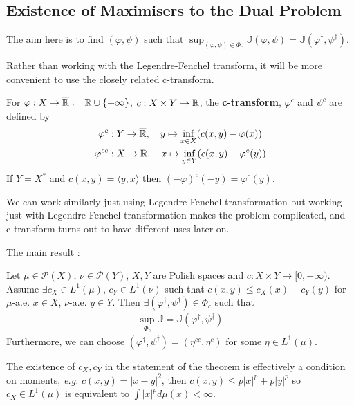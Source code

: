 \documentclass[12pt,a4paper]{article}
\begin{document}
\subsection{Existence of Maximisers to the Dual Problem}

The aim here is to find $(\varphi, \psi)$ such that $\sup_{(\varphi, \psi)\in \Phi_c} \mathbb{J}(\varphi, \psi) = \mathbb{J}(\varphi^{\dagger}, \psi^{\dagger})$.

\quad Rather than working with the Legendre-Fenchel transform, it will be more convenient to use the closely related c-transform.
\s

 For $\varphi : X\rightarrow \overline{\mathbb{R}} := \mathbb{R} \cup \{+\infty \}$, $c: X\times Y \rightarrow \mathbb{R}$, the \textbf{c-transform}, $\varphi^c$ and $\psi^c$ are defined by
\begin{align*}
\varphi^c &: Y\rightarrow \overline{\mathbb{R}}, \quad y\mapsto \inf_{x\in X} (c(x,y) - \varphi(x)) \\
\varphi^{cc} &: X\rightarrow \mathbb{R}, \quad x\mapsto \inf_{y\in Y} (c(x,y) -\varphi^c(y))
\end{align*}
If $Y= X^*$ and $c(x,y) = \langle y, x\rangle$ then $(-\varphi)^c (-y) = \varphi^c(y)$.

\quad We can work similarly just using Legendre-Fenchel transformation but working just with Legendre-Fenchel transformation makes the problem complicated, and c-transform turns out to have different uses later on.
\s

The main result :
\s

 Let $\mu \in \mathscr{P}(X)$, $\nu\in \mathscr{P}(Y)$, $X,Y$ are Polish spaces and $c: X\times Y\rightarrow [0, +\infty)$. Assume $\exists c_X \in L^1(\mu)$, $c_Y \in L^1(\nu)$ such that $c(x,y) \leq c_X(x) + c_Y(y)$ for $\mu$-a.e. $x\in X$, $\nu$-a.e. $y\in Y$. Then $\exists (\varphi^{\dagger}, \psi^{\dagger}) \in \Phi_c$ such that
\begin{align*}
\sup_{\Phi_c} \mathbb{J}= \mathbb{J}(\varphi^{\dagger}, \psi^{\dagger})
\end{align*}
Furthermore, we can choose $(\varphi^{\dagger},\psi^{\dagger}) = (\eta^{cc}, \eta^c)$ for some $\eta \in L^1(\mu)$.
\s

The existence of $c_X,c_Y$ in the statement of the theorem is effectively a condition on moments, \textit{e.g.} $c(x,y) = |x-y|^2$, then $c(x,y) \leq p|x|^p + p|y|^p$ so $c_X \in L^1(\mu) $ is equivalent to $\int |x|^p d\mu(x) < \infty$.
\s

\newday
\end{document}
